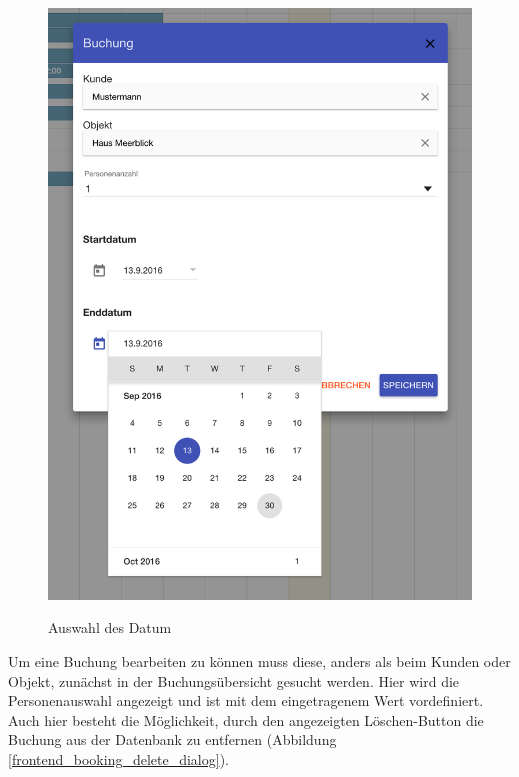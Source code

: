 \begin{figure}[H]
\begin{minipage}[t]{0.49\linewidth}
        \includegraphics[width=\linewidth]{images/frontend_booking_calender.png}
        \label{frontend_booking_calender}
        \caption{Auswahl des Datum}
    \end{minipage}
\end{figure}

Um eine Buchung bearbeiten zu können muss diese, anders als beim Kunden oder Objekt, zunächst in der Buchungsübersicht gesucht werden.
Hier wird die Personenauswahl angezeigt und ist mit dem eingetragenem Wert vordefiniert. Auch hier besteht die Möglichkeit, durch den
angezeigten Löschen-Button die Buchung aus der Datenbank zu entfernen (Abbildung \ref{frontend_booking_delete_dialog}).

